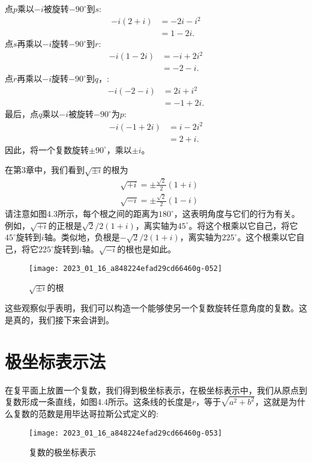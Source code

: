 点$p$乘以$-i$被旋转$-90^{\circ}$到$s$:
$$
\begin{aligned}
-i(2+i) & =-2 i-i^{2} \\
& =1-2 i .
\end{aligned}
$$
点$s$再乘以$-i$旋转$-90^{\circ}$到$r$:
$$
\begin{aligned}
-i(1-2 i) & =-i+2 i^{2} \\
& =-2-i .
\end{aligned}
$$
点$r$再乘以$-i$旋转$-90^{\circ}$到$q$，:
$$
\begin{aligned}
-i(-2-i) & =2 i+i^{2} \\
& =-1+2 i .
\end{aligned}
$$
最后，点$q$乘以$-i$被旋转$-90^{\circ}$为$p$:
$$
\begin{aligned}
-i(-1+2 i) & =i-2 i^{2} \\
& =2+i .
\end{aligned}
$$
因此，将一个复数旋转$\pm 90^{\circ}$，乘以$\pm i$。

在第3章中，我们看到$\sqrt{\pm i}$的根为
$$
\begin{aligned}
& \sqrt{+i}=\pm \frac{\sqrt{2}}{2}(1+i) \\
& \sqrt{-i}=\pm \frac{\sqrt{2}}{2}(1-i)
\end{aligned}
$$
请注意如图4.3所示，每个根之间的距离为$180^{\circ}$，这表明角度与它们的行为有关。例如，$\sqrt{+i}$的正根是$\sqrt{2}/ 2(1+i)$，离实轴为$45^{\circ}$。将这个根乘以它自己，将它$45^{\circ}$旋转到$i$轴。类似地，负根是$-\sqrt{2}/ 2(1+i)$，离实轴为$225^{\circ}$。这个根乘以它自己，将它$225^{\circ}$旋转到$i$轴。$\sqrt{-i}$的根也是如此。

\begin{figure}[h!]
    \centering
    \texttt{[image: 2023\_01\_16\_a848224efad29cd66460g-052]}
    \caption[short]{$\sqrt{\pm i}$的根}
\end{figure}

这些观察似乎表明，我们可以构造一个能够使另一个复数旋转任意角度的复数。这是真的，我们接下来会讲到。

\section{极坐标表示法}
在复平面上放置一个复数，我们得到极坐标表示，在极坐标表示中，我们从原点到复数形成一条直线，如图4.4所示。这条线的长度是$r$，等于$\sqrt{a^{2}+b^{2}}$，这就是为什么复数的范数是用毕达哥拉斯公式定义的:
\begin{figure}[h!]
    \centering
    \texttt{[image: 2023\_01\_16\_a848224efad29cd66460g-053]}
    \caption[short]{复数的极坐标表示
    }
\end{figure}

